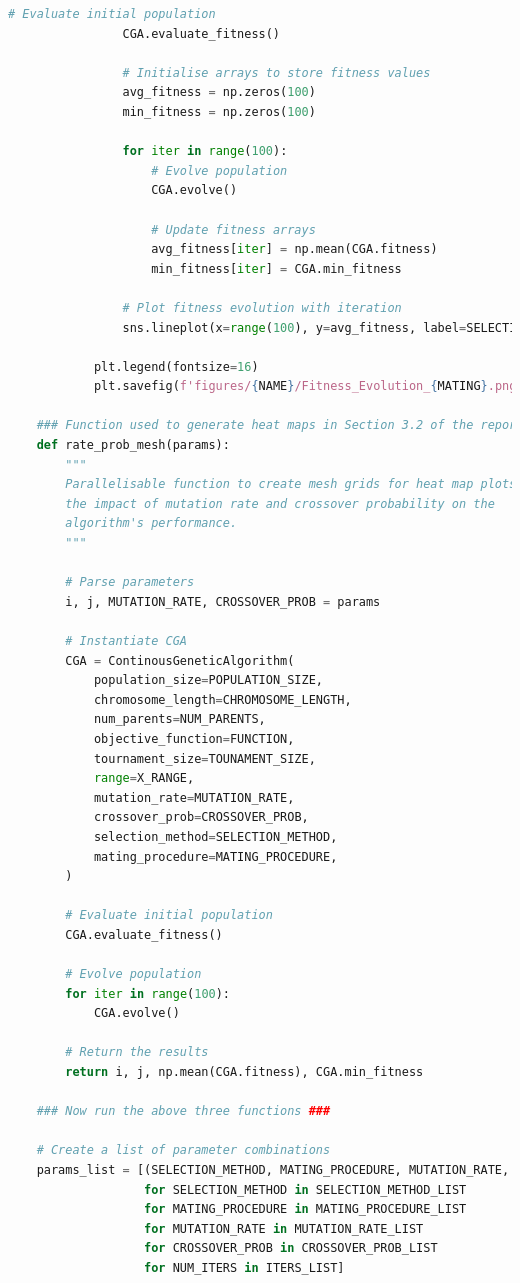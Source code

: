 \documentclass[10pt]{article}
\begin{document}
\begin{lstlisting}[language=Python, caption=CGA\_TuningExperiments.py, label=CGA_TuningExperimentspy]
                # Evaluate initial population
                CGA.evaluate_fitness()
    
                # Initialise arrays to store fitness values
                avg_fitness = np.zeros(100)
                min_fitness = np.zeros(100)
    
                for iter in range(100):
                    # Evolve population
                    CGA.evolve()
    
                    # Update fitness arrays
                    avg_fitness[iter] = np.mean(CGA.fitness)
                    min_fitness[iter] = CGA.min_fitness
    
                # Plot fitness evolution with iteration
                sns.lineplot(x=range(100), y=avg_fitness, label=SELECTION_METHOD)
    
            plt.legend(fontsize=16)
            plt.savefig(f'figures/{NAME}/Fitness_Evolution_{MATING}.png')
    
    ### Function used to generate heat maps in Section 3.2 of the report ###
    def rate_prob_mesh(params):
        """
        Parallelisable function to create mesh grids for heat map plots to assess
        the impact of mutation rate and crossover probability on the
        algorithm's performance.
        """
    
        # Parse parameters
        i, j, MUTATION_RATE, CROSSOVER_PROB = params
    
        # Instantiate CGA
        CGA = ContinousGeneticAlgorithm(
            population_size=POPULATION_SIZE,
            chromosome_length=CHROMOSOME_LENGTH,
            num_parents=NUM_PARENTS,
            objective_function=FUNCTION,
            tournament_size=TOUNAMENT_SIZE,
            range=X_RANGE,
            mutation_rate=MUTATION_RATE,
            crossover_prob=CROSSOVER_PROB,
            selection_method=SELECTION_METHOD,
            mating_procedure=MATING_PROCEDURE,
        )
    
        # Evaluate initial population
        CGA.evaluate_fitness()
    
        # Evolve population
        for iter in range(100):
            CGA.evolve()
    
        # Return the results
        return i, j, np.mean(CGA.fitness), CGA.min_fitness
    
    ### Now run the above three functions ###
    
    # Create a list of parameter combinations
    params_list = [(SELECTION_METHOD, MATING_PROCEDURE, MUTATION_RATE, CROSSOVER_PROB, NUM_ITERS)
                   for SELECTION_METHOD in SELECTION_METHOD_LIST
                   for MATING_PROCEDURE in MATING_PROCEDURE_LIST
                   for MUTATION_RATE in MUTATION_RATE_LIST
                   for CROSSOVER_PROB in CROSSOVER_PROB_LIST
                   for NUM_ITERS in ITERS_LIST]
    

\end{lstlisting}
\end{document}
